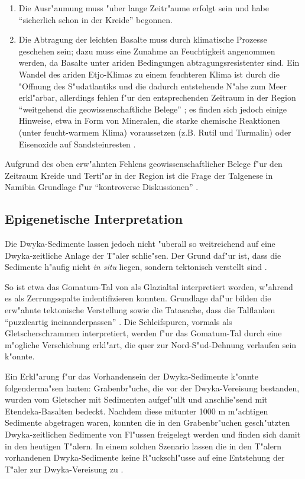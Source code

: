 \documentclass[titlepage,a4paper]{scrartcl}
\begin{document}
\begin{enumerate}
\item Die Ausr"aumung muss "uber lange Zeitr"aume erfolgt sein und habe ``sicherlich schon in der Kreide'' \citep{HueserEtAl2003} begonnen.
\item Die Abtragung der leichten Basalte muss durch klimatische Prozesse geschehen sein; dazu muss eine Zunahme an Feuchtigkeit angenommen werden, da Basalte unter ariden Bedingungen abtragungsresistenter sind. Ein Wandel des ariden Etjo-Klimas zu einem feuchteren Klima ist durch die "Offnung des S"udatlantiks und die dadurch entstehende N"ahe zum Meer erkl"arbar, allerdings fehlen f"ur den entsprechenden Zeitraum in der Region ``weitgehend die geowissenschaftliche Belege'' \citep{HueserEtAl2003}; es finden sich jedoch einige Hinweise, etwa in Form von Mineralen, die starke chemische Reaktionen (unter feucht-warmem Klima) voraussetzen (z.B. Rutil und Turmalin) oder Eisenoxide auf Sandsteinresten \citep{HueserEtAl2003}.
\end{enumerate}

Aufgrund des oben erw"ahnten Fehlens geowissenschaftlicher Belege f"ur den Zeitraum Kreide und Terti"ar in der Region ist die Frage der Talgenese in Namibia Grundlage f"ur ``kontroverse Diskussionen'' \citep{HueserEtAl2003}.

\subsection{Epigenetische Interpretation} \label{epigenetisch}

Die Dwyka-Sedimente lassen jedoch nicht "uberall so weitreichend auf eine Dwyka-zeitliche Anlage der T"aler schlie"sen. Der Grund daf"ur ist, dass die Sedimente h"aufig nicht \emph{in situ} liegen, sondern tektonisch verstellt sind \citep{BrunotteAndSpoenemann1997}. 

So ist etwa das Gomatum-Tal von \cite{Martin1969} als Glazialtal interpretiert worden, w"ahrend \cite{BrunotteAndSpoenemann1997} es als Zerrungsspalte indentifizieren konnten. Grundlage daf"ur bilden die erw"ahnte tektonische Verstellung sowie die Tatasache, dass die Talflanken ``puzzleartig ineinanderpassen'' \citep{BrunotteAndSpoenemann1997}. Die Schleifspuren, vormals als Gletscherschrammen interpretiert, werden f"ur das Gomatum-Tal durch eine m"ogliche Verschiebung erkl"art, die quer zur Nord-S"ud-Dehnung verlaufen sein k"onnte.

Ein Erkl"arung f"ur das Vorhandensein der Dwyka-Sedimente k"onnte folgenderma"sen lauten: Grabenbr"uche, die vor der Dwyka-Vereisung bestanden, wurden vom Gletscher mit Sedimenten aufgef"ullt und anschlie"send mit Etendeka-Basalten bedeckt. Nachdem diese mitunter 1000 m m"achtigen Sedimente abgetragen waren, konnten die in den Grabenbr"uchen gesch"utzten Dwyka-zeitlichen Sedimente von Fl"ussen freigelegt werden und finden sich damit in den heutigen T"alern. In einem solchen Szenario lassen die in den T"alern vorhandenen Dwyka-Sedimente keine R"uckschl"usse auf eine Entstehung der T"aler zur Dwyka-Vereisung zu .
\end{document}
